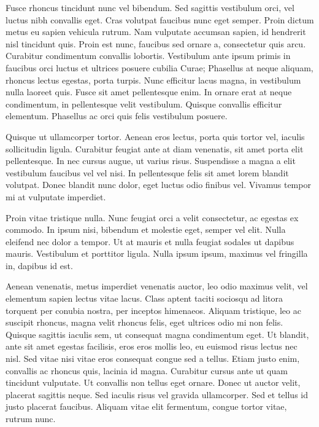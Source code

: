 \documentclass[10pt,fleqn]{article} %
\begin{document}
\begin{corrige}
Fusce rhoncus tincidunt nunc vel bibendum. Sed sagittis vestibulum orci, vel luctus nibh convallis eget. Cras volutpat faucibus nunc eget semper. Proin dictum metus eu sapien vehicula rutrum. Nam vulputate accumsan sapien, id hendrerit nisl tincidunt quis. Proin est nunc, faucibus sed ornare a, consectetur quis arcu. Curabitur condimentum convallis lobortis. Vestibulum ante ipsum primis in faucibus orci luctus et ultrices posuere cubilia Curae; Phasellus at neque aliquam, rhoncus lectus egestas, porta turpis. Nunc efficitur lacus magna, in vestibulum nulla laoreet quis. Fusce sit amet pellentesque enim. In ornare erat at neque condimentum, in pellentesque velit vestibulum. Quisque convallis efficitur elementum. Phasellus ac orci quis felis vestibulum posuere.
\end{corrige}

\begin{warn}
Quisque ut ullamcorper tortor. Aenean eros lectus, porta quis tortor vel, iaculis sollicitudin ligula. Curabitur feugiat ante at diam venenatis, sit amet porta elit pellentesque. In nec cursus augue, ut varius risus. Suspendisse a magna a elit vestibulum faucibus vel vel nisi. In pellentesque felis sit amet lorem blandit volutpat. Donec blandit nunc dolor, eget luctus odio finibus vel. Vivamus tempor mi at vulputate imperdiet.
\end{warn}

\begin{rem}
Proin vitae tristique nulla. Nunc feugiat orci a velit consectetur, ac egestas ex commodo. In ipsum nisi, bibendum et molestie eget, semper vel elit. Nulla eleifend nec dolor a tempor. Ut at mauris et nulla feugiat sodales ut dapibus mauris. Vestibulum et porttitor ligula. Nulla ipsum ipsum, maximus vel fringilla in, dapibus id est.
\end{rem}

\begin{exemple}
Aenean venenatis, metus imperdiet venenatis auctor, leo odio maximus velit, vel elementum sapien lectus vitae lacus. Class aptent taciti sociosqu ad litora torquent per conubia nostra, per inceptos himenaeos. Aliquam tristique, leo ac suscipit rhoncus, magna velit rhoncus felis, eget ultrices odio mi non felis. Quisque sagittis iaculis sem, ut consequat magna condimentum eget. Ut blandit, ante sit amet egestas facilisis, eros eros mollis leo, eu euismod risus lectus nec nisl. Sed vitae nisi vitae eros consequat congue sed a tellus. Etiam justo enim, convallis ac rhoncus quis, lacinia id magna. Curabitur cursus ante ut quam tincidunt vulputate. Ut convallis non tellus eget ornare. Donec ut auctor velit, placerat sagittis neque. Sed iaculis risus vel gravida ullamcorper. Sed et tellus id justo placerat faucibus. Aliquam vitae elit fermentum, congue tortor vitae, rutrum nunc. 
\end{exemple}
\end{document}
